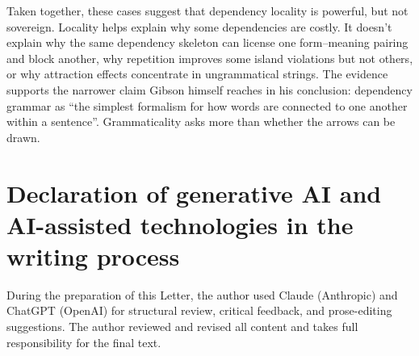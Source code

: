\documentclass[12pt]{article}
\begin{document}
Taken together, these cases suggest that dependency locality is powerful, but not sovereign.
Locality helps explain why some dependencies are costly.
It doesn't explain why the same dependency skeleton can license one form--meaning pairing and block another, why repetition improves some island violations but not others, or why attraction effects concentrate in ungrammatical strings.
The evidence supports the narrower claim Gibson himself reaches in his conclusion: dependency grammar as \enquote{the simplest formalism for how words are connected to one another within a sentence}.
Grammaticality asks more than whether the arrows can be drawn.

\section*{Declaration of generative AI and AI-assisted technologies in the writing process}

During the preparation of this Letter, the author used Claude (Anthropic) and ChatGPT (OpenAI) for structural review, critical feedback, and prose-editing suggestions. The author reviewed and revised all content and takes full responsibility for the final text.

\printbibliography
\end{document}
